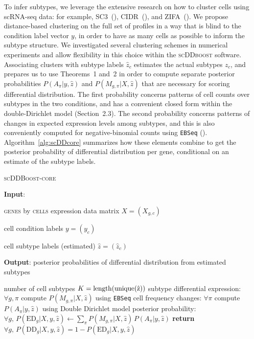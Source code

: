 \documentclass[aoas,preprint]{imsart}
\begin{document}
To infer subtypes, we leverage the extensive research on how to cluster cells using scRNA-seq data:
for example,  SC3~(\cite{sc3}), CIDR~(\cite{CIDR}), and ZIFA~(\cite{ZIFA}). 
We propose distance-based clustering on the full set
of profiles in a way that is blind to the condition label vector $y$, in order to have as many cells as possible
to inform the subtype structure.  We investigated several clustering schemes in numerical experiments and allow 
flexibility in this choice within the \textsc{scDDboost} software. 
Associating clusters with subtype labels $\hat z_c$  estimates
the actual subtypes $z_c$, and prepares us to use Theorems~1 and~2 in order to compute separate
posterior probabilities $P(A_\pi|y, \hat z)$ and $P(M_{g, \pi}| X, \hat z)$ that are necessary for scoring
differential distribution. The first probability concerns patterns of cell counts over subtypes in the two conditions,
and has a convenient closed form within the double-Dirichlet model (Section~2.3).
The second probability concerns patterns of changes in expected expression levels among subtypes, and this is
also conveniently computed for negative-binomial counts using \texttt{EBSeq} (\cite{ref:Leng}). 
Algorithm~\ref{alg:scDDcore}
summarizes how these elements combine to get the posterior probability of differential distribution per gene,
conditional on an estimate of the subtype labels.


\begin{algorithm}
\caption{\textsc{scDDBoost-core}}\label{alg:scDDcore}
\raggedright\hspace*{\algorithmicindent} \textbf{Input}: \begin{list}{}{}
 \item \textsc{genes} by \textsc{cells} expression data matrix $X=(X_{g,c})$
 \item  cell condition labels $y=(y_c)$ 
 \item  cell subtype labels (estimated)  $\hat z=(\hat z_c)$
 \end{list}
\hspace*{\algorithmicindent} 
\textbf{Output}:  posterior probabilities of differential distribution from estimated subtypes
\begin{algorithmic}[1]
 \item  number of cell subtypes $K = \rm{length}( \rm{unique}( \hat z ) )$  
\State subtype differential expression: $\forall g,\pi$ compute  $P(M_{g,\pi} | X, \hat z)$ using \verb+EBSeq+
\State cell frequency changes: $\forall \pi$ compute  $P(A_\pi | y, \hat z)$ using Double Dirichlet model 
\State posterior probability: $\forall g,  \, P(\text{ED}_g | X, y, \hat z)\gets \underset{\pi}{\sum}P(M_{g,\pi} | X, \hat z) \,
 P(A_\pi | y, \hat z)$
\State \textbf{return} $\forall g, \, P(\text{DD}_g |X, y, \hat z)=1-P(\text{ED}_g| X,y, \hat z)$
\EndProcedure
\end{algorithmic}
\end{algorithm}
\end{document}
